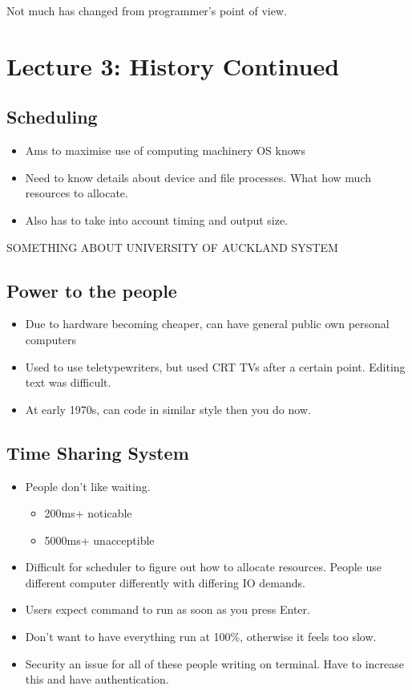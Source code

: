 \documentclass{article}
\begin{document}
		Not much has changed from programmer's point of view.


\section{Lecture 3: History Continued}
	\subsection{Scheduling}
		\begin{itemize}
			\item Ams to maximise use of computing machinery OS knows
			\item Need to know details about device and file processes. What how much resources to allocate.
			\item Also has to take into account timing and output size.
		\end{itemize}

		SOMETHING ABOUT UNIVERSITY OF AUCKLAND SYSTEM

	\subsection{Power to the people}
		\begin{itemize}
			\item Due to hardware becoming cheaper, can have general public own personal computers
			\item Used to use teletypewriters, but used CRT TVs after a certain point. Editing text was difficult.
			\item At early 1970s, can code in similar style then you do now.
		\end{itemize}

	\subsection{Time Sharing System}
		\begin{itemize}
			\item People don't like waiting.
			\begin{itemize}
				\item 200ms+ noticable
				\item 5000ms+ unacceptible
			\end{itemize}
			\item Difficult for scheduler to figure out how to allocate resources. People use different computer differently with differing IO demands.
			\item Users expect command to run as soon as you press Enter.
			\item Don't want to have everything run at 100\%, otherwise it feels too slow.
			\item Security an issue for all of these people writing on terminal. Have to increase this and have authentication.
		\end{itemize}
		
\end{document}

